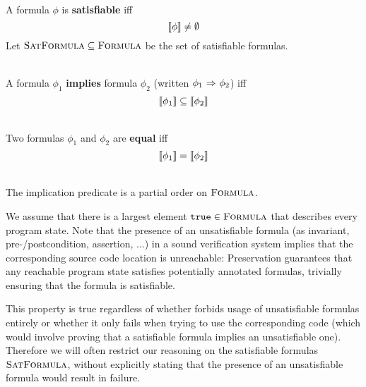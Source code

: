 \begin{description}
    
    \begin{definition}~\\
        A formula $\phi$ is \textbf{satisfiable} iff $$\llbracket {\phi} \rrbracket \neq \emptyset$$
        Let $\textup{\textsc{SatFormula}} \subseteq \textup{\textsc{Formula}}$ be the set of satisfiable formulas.
    \end{definition}
    
    \begin{definition}~\\
        A formula $\phi_1$ \textbf{implies} formula $\phi_2$ (written ${\phi_1} \,\,{\Rightarrow}\,\, {\phi_2}$) iff
        \begin{displaymath}
        \llbracket {\phi_1} \rrbracket \subseteq \llbracket {\phi_2} \rrbracket
        \end{displaymath}
    \end{definition}
    
    \begin{definition}~\\
        Two formulas $\phi_1$ and $\phi_2$ are \textbf{equal} iff
        \begin{displaymath}
        \llbracket {\phi_1} \rrbracket = \llbracket {\phi_2} \rrbracket
        \end{displaymath}
    \end{definition} 
    
    
    \begin{lemma}~\\
        The implication predicate is a partial order on $\textup{\textsc{Formula}}$.
    \end{lemma}
    
    We assume that there is a largest element $\textup{\texttt{true}} \in \textup{\textsc{Formula}}$ that describes every program state.
    Note that the presence of an unsatisfiable formula (as invariant, pre-/postcondition, assertion, ...) in a sound verification system implies that the corresponding source code location is unreachable:
    Preservation guarantees that any reachable program state satisfies potentially annotated formulas, trivially ensuring that the formula is satisfiable.
    
    This property is true regardless of whether \svl forbids usage of unsatisfiable formulas entirely or whether it only fails when trying to use the corresponding code (which would involve proving that a satisfiable formula implies an unsatisfiable one).
    Therefore we will often restrict our reasoning on the satisfiable formulas $\textup{\textsc{SatFormula}}$, without explicitly stating that the presence of an unsatisfiable formula would result in failure.
    

\end{description}
